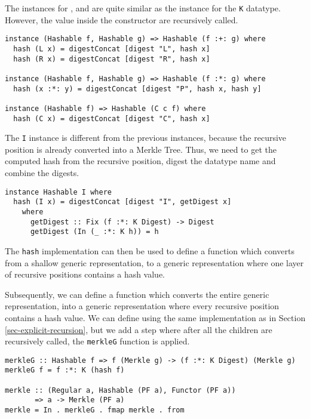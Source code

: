 The instances for \inlinehaskell{:+:}, \inlinehaskell{:*:} and  are quite similar as the instance for the \texttt{K} datatype. However, the value inside the constructor are recursively called.

\begin{verbatim}
instance (Hashable f, Hashable g) => Hashable (f :+: g) where
  hash (L x) = digestConcat [digest "L", hash x]
  hash (R x) = digestConcat [digest "R", hash x]

instance (Hashable f, Hashable g) => Hashable (f :*: g) where
  hash (x :*: y) = digestConcat [digest "P", hash x, hash y]

instance (Hashable f) => Hashable (C c f) where
  hash (C x) = digestConcat [digest "C", hash x]
\end{verbatim}

The \texttt{I} instance is different from the previous instances, because the recursive position is already converted into a Merkle Tree. Thus, we need to get the computed hash from the recursive position, digest the datatype name and combine the digests. 

\begin{verbatim}
instance Hashable I where
  hash (I x) = digestConcat [digest "I", getDigest x]
    where
      getDigest :: Fix (f :*: K Digest) -> Digest
      getDigest (In (_ :*: K h)) = h
\end{verbatim}

The \texttt{hash} implementation can then be used to define a function  which converts from a shallow generic representation, to a generic representation where one layer of recursive positions contains a hash value. 

Subsequently, we can define a function  which converts the entire generic representation, into a generic representation where every recursive position contains a hash value. We can define  using the same implementation as in Section \ref*{sec-explicit-recursion}, but we add a step where after all the children are recursively called, the \texttt{merkleG} function is applied. 

\begin{verbatim}
merkleG :: Hashable f => f (Merkle g) -> (f :*: K Digest) (Merkle g)
merkleG f = f :*: K (hash f)

merkle :: (Regular a, Hashable (PF a), Functor (PF a))
       => a -> Merkle (PF a)
merkle = In . merkleG . fmap merkle . from
\end{verbatim}

